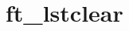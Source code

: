 \chapter{ft\+\_\+lstclear}
\hypertarget{md_Documentation_2ft__lstclear}{}\label{md_Documentation_2ft__lstclear}
